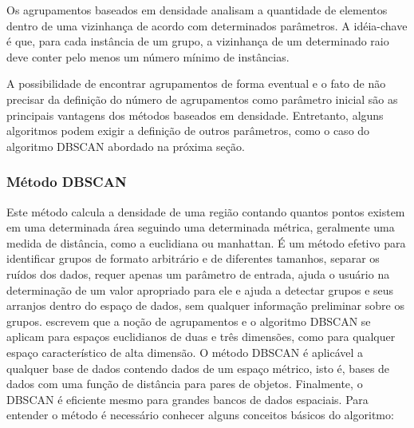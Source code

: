 Os agrupamentos baseados em densidade analisam a quantidade de elementos dentro de uma vizinhança de acordo com determinados parâmetros. A idéia-chave é que, para cada instância de um grupo, a vizinhança de um determinado raio deve conter pelo menos um número mínimo de instâncias.

A possibilidade de encontrar agrupamentos de forma eventual e o fato de não precisar da definição do número de agrupamentos \cite{yip2005} como parâmetro inicial são as principais vantagens dos métodos baseados em densidade. Entretanto, alguns algoritmos podem exigir a definição de outros parâmetros, como o caso do algoritmo DBSCAN \cite{ESTER1996} abordado na próxima seção.

\subsubsection{Método DBSCAN}
\label{dbscan}

Este método calcula a densidade de uma região contando quantos pontos existem em uma determinada área seguindo uma determinada métrica, geralmente uma medida de distância, como a euclidiana ou manhattan. 
É um método efetivo para identificar grupos de formato arbitrário e de diferentes tamanhos, separar os ruídos dos dados, requer apenas um parâmetro de entrada, ajuda o usuário na determinação de um valor apropriado para ele e ajuda a detectar grupos e seus arranjos dentro do espaço de dados, sem qualquer informação preliminar sobre os grupos.
\cite{ESTER1996}  escrevem que a noção de agrupamentos e o algoritmo DBSCAN se aplicam para espaços euclidianos de duas e três dimensões, como para qualquer espaço característico de alta dimensão. O método DBSCAN é aplicável a qualquer base de dados contendo dados de um espaço métrico, isto é, bases de dados com uma função de distância para pares de objetos. Finalmente, o DBSCAN é eficiente mesmo para grandes bancos de dados espaciais.
Para entender o método é necessário conhecer alguns conceitos básicos do algoritmo: 

